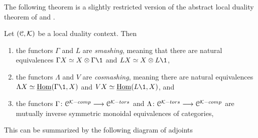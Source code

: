 The following theorem is a slightly restricted version of the abstract local duality theorem of \cite[3.3.5]{hovey-palmiery-strickland_97} and \cite[2.21]{barthel-heard-valenzuela_2018}.  

\begin{theorem}
    \label{ch2:thm:local-duality}
    Let $(\EuScript{C}, \mathcal{K})$ be a local duality context. Then
    \begin{enumerate}
        \item the functors $\Gamma$ and $L$ are \emph{smashing}, meaning that there are natural equivalences $\Gamma X\simeq X\otimes \Gamma \1$ and $LX\simeq X\otimes L\1$,
        \item the functors $\Lambda$ and $V$ are \emph{cosmashing}, meaning there are natural equivalences $\Lambda X\simeq \iHom(\Gamma \1,X)$ and $VX\simeq \iHom(L\1, X)$, and 
        \item the functors $\Gamma\colon \EuScript{C}^{\mathcal{K}-comp}\longrightarrow \EuScript{C}^{\mathcal{K}-tors}$ and $\Lambda\colon \EuScript{C}^{\mathcal{K}-tors}\longrightarrow \EuScript{C}^{\mathcal{K}-comp}$ are mutually inverse symmetric monoidal equivalences of categories,
    \end{enumerate}
    This can be summarized by the following diagram of adjoints
    \begin{center}
    \end{center}
\end{theorem}

